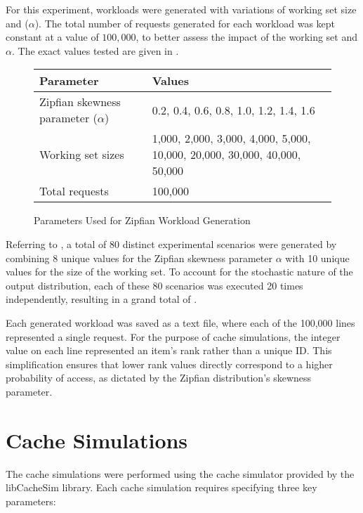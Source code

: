 For this experiment, workloads were generated with variations of working set size and  ($\alpha$). The total number of requests generated for each workload was kept constant at a value of \textbf{$100,000$}, to better assess the impact of the working set and $\alpha$. The exact values tested are given in .

\begin{figure}[h!]
    \centering
    \caption{Parameters Used for Zipfian Workload Generation}
    \label{tab: data-params}
    \begin{tabularx}{\textwidth}{lX}
        \toprule
        \textbf{Parameter} & \textbf{Values} \\
        \midrule
        Zipfian skewness parameter ($\alpha$) & 0.2, 0.4, 0.6, 0.8, 1.0, 1.2, 1.4, 1.6 \\
        Working set sizes & 1,000, 2,000, 3,000, 4,000, 5,000, 10,000, 20,000, 30,000, 40,000, 50,000 \\
        Total requests & 100,000 \\
        \bottomrule
    \end{tabularx}
\end{figure}

Referring to , a total of 80 distinct experimental scenarios were generated by combining 8 unique values for the Zipfian skewness parameter $\alpha$ with 10 unique values for the size of the working set. To account for the stochastic nature of the output distribution, each of these 80 scenarios was executed 20 times independently, resulting in a grand total of .

Each generated workload was saved as a text file, where each of the 100,000 lines represented a single request. For the purpose of cache simulations, the integer value on each line represented an item's rank rather than a unique ID. This simplification ensures that lower rank values directly correspond to a higher probability of access, as dictated by the Zipfian distribution's skewness parameter.

\section{Cache Simulations}\label{subsec: cache-simulations}

The cache simulations were performed using the cache simulator provided by the libCacheSim library. Each cache simulation requires specifying three key parameters:

